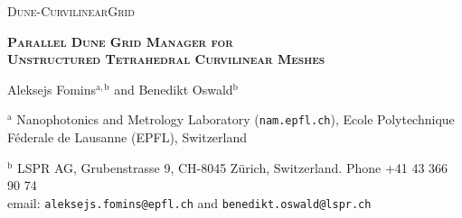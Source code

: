 \documentclass[a4paper,11pt]{article}
\begin{document}
\lstset{language=C++, breaklines=true}




\begin{center}
    
\noindent \textsc{{\Large Dune-CurvilinearGrid}}

\vspace{5mm}

\noindent \textbf{\textsc{{\Large Parallel Dune Grid Manager for\\Unstructured Tetrahedral Curvilinear Meshes}}}
  
\vspace{2mm}
    
{\large
    
\noindent Aleksejs Fomins$^{\mathrm{a,b}}$ and Benedikt Oswald$^{\mathrm{b}}$

  }

\vspace{1mm}

\noindent $^{\mathrm{a}}$ Nanophotonics and Metrology Laboratory (\texttt{nam.epfl.ch}), 
\noindent Ecole Polytechnique F\'ederale de Lausanne (EPFL), Switzerland
  
\vspace{1mm}

\noindent $^{\mathrm{b}}$ LSPR AG, Grubenstrasse 9, CH-8045 Z\"urich, Switzerland.
\noindent Phone +41 43 366 90 74 \\
\noindent
email: \texttt{aleksejs.fomins@epfl.ch} and \texttt{benedikt.oswald@lspr.ch}

\vspace{2mm}

\end{center}
\end{document}
